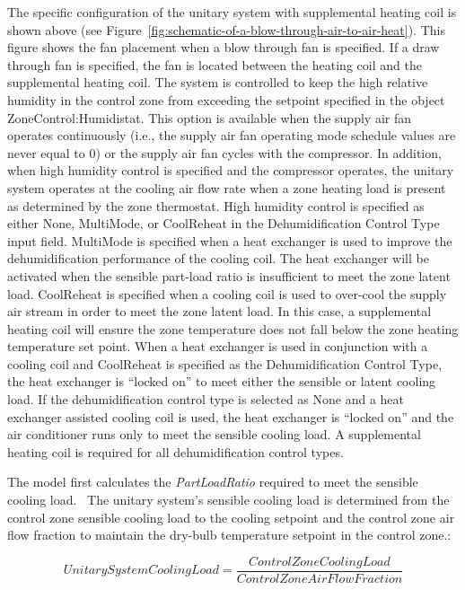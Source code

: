 The specific configuration of the unitary system with supplemental heating coil is shown above (see Figure~\ref{fig:schematic-of-a-blow-through-air-to-air-heat}). This figure shows the fan placement when a blow through fan is specified. If a draw through fan is specified, the fan is located between the heating coil and the supplemental heating coil. The system is controlled to keep the high relative humidity in the control zone from exceeding the setpoint specified in the object ZoneControl:Humidistat. This option is available when the supply air fan operates continuously (i.e., the supply air fan operating mode schedule values are never equal to 0) or the supply air fan cycles with the compressor. In addition, when high humidity control is specified and the compressor operates, the unitary system operates at the cooling air flow rate when a zone heating load is present as determined by the zone thermostat. High humidity control is specified as either None, MultiMode, or CoolReheat in the Dehumidification Control Type input field. MultiMode is specified when a heat exchanger is used to improve the dehumidification performance of the cooling coil. The heat exchanger will be activated when the sensible part-load ratio is insufficient to meet the zone latent load. CoolReheat is specified when a cooling coil is used to over-cool the supply air stream in order to meet the zone latent load. In this case, a supplemental heating coil will ensure the zone temperature does not fall below the zone heating temperature set point. When a heat exchanger is used in conjunction with a cooling coil and CoolReheat is specified as the Dehumidification Control Type, the heat exchanger is ``locked on'' to meet either the sensible or latent cooling load. If the dehumidification control type is selected as None and a heat exchanger assisted cooling coil is used, the heat exchanger is ``locked on'' and the air conditioner runs only to meet the sensible cooling load. A supplemental heating coil is required for all dehumidification control types.

The model first calculates the \emph{PartLoadRatio} required to meet the sensible cooling load.~ The unitary system's sensible cooling load is determined from the control zone sensible cooling load to the cooling setpoint and the control zone air flow fraction to maintain the dry-bulb temperature setpoint in the control zone.:

\begin{equation}
UnitarySystemCoolingLoad = \frac{{ControlZoneCoolingLoad}}{{ControlZoneAirFlowFraction}}
\end{equation}

